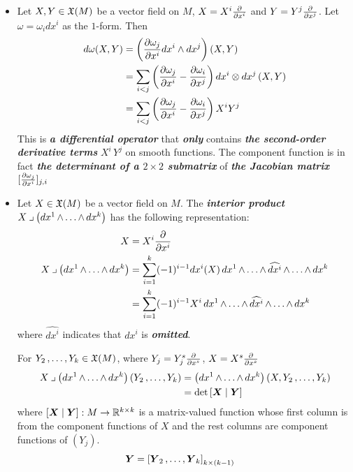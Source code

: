 \documentclass[11pt]{article}
\begin{document}
\begin{itemize}
\item Let $X, Y \in {\mathfrak X}(M)$ be a vector field on $M$, $X = X^i \frac{\partial }{ \partial x^i}$ and $Y = Y^j\frac{\partial }{ \partial x^j}$. Let $\omega = \omega_i dx^i$ as the $1$-form.  Then 
\begin{align}
d\omega(X, Y)&= \left(\frac{\partial \omega_j}{ \partial x^i}dx^i \wedge dx^j\right)\left(X, Y\right) \nonumber\\
&=\sum_{i < j}\left(\frac{\partial \omega_j}{ \partial x^i} - \frac{\partial \omega_i}{ \partial x^j}\right)dx^i \otimes dx^j\left(X, Y\right) \nonumber\\
&= \sum_{i < j}\left(\frac{\partial \omega_j}{ \partial x^i} - \frac{\partial \omega_i}{ \partial x^j}\right)X^i Y^j \label{eqn: ext_derivative_act_on_two_vector_fields}
\end{align} This is \emph{\textbf{a differential operator}} that \emph{\textbf{only}} contains \emph{\textbf{the second-order derivative terms}} $X^i\,Y^j$ on smooth functions. The component function is in fact \emph{\textbf{the determinant of a $2 \times 2$ submatrix}} of \emph{\textbf{the Jacobian matrix}} $[\frac{\partial \omega_j}{ \partial x^i}]_{j, i}$

\item Let $X \in {\mathfrak X}(M)$ be a vector field on $M$. The \emph{\textbf{interior product}} $X \mathbin{\lrcorner }{\left(dx^{1} \,{\wedge}\ldots{\wedge}\, dx^{k}\right)}$ has the following representation:
\begin{align}
X &= X^i \frac{\partial }{ \partial x^{i}}  \nonumber\\
X \mathbin{\lrcorner }{\left(dx^{1} \,{\wedge}\ldots{\wedge}\, dx^{k}\right)} &= \sum_{i=1}^{k}(-1)^{i-1}dx^i(X) \,dx^{1} \,{\wedge}\ldots{\wedge}\, \widehat{dx^i} \,{\wedge}\ldots{\wedge}\, dx^{k} \nonumber \\
&= \sum_{i=1}^{k}(-1)^{i-1}X^i\,dx^{1} \,{\wedge}\ldots{\wedge}\, \widehat{dx^i} \,{\wedge}\ldots{\wedge}\, dx^{k} \label{eqn: differential_k_form_interior_prod}
\end{align} where $\widehat{dx^i}$ indicates that $dx^i$ is \emph{\textbf{omitted}}.  

For $Y_2 \,{,}\ldots{,}\, Y_k \in {\mathfrak X}(M)$, where $Y_j = Y_j^{s}\frac{\partial }{ \partial x^s}$, $X = X^s\frac{\partial }{ \partial x^s}$
\begin{align}
X \mathbin{\lrcorner }{\left(dx^{1} \,{\wedge}\ldots{\wedge}\, dx^{k}\right)}\left(Y_2 \,{,}\ldots{,}\, Y_k\right)&=\left(dx^{1} \,{\wedge}\ldots{\wedge}\, dx^{k}\right)\left(X, Y_2 \,{,}\ldots{,}\, Y_k\right) \nonumber\\
&= \det\left[\boldsymbol{X} \mid \boldsymbol{Y}\right] \label{eqn: differential_k_form_interior_prod_mat_result}
\end{align} where $\left[\boldsymbol{X} \mid \boldsymbol{Y}\right]: M \rightarrow {\mathbb R}^{k \times k}$ is a matrix-valued function whose first column is from the component functions of $X$ and the rest columns are component functions of $(Y_j)$.
\begin{align*}
\boldsymbol{Y} &= \left[\boldsymbol{Y}_2 \,{,}\ldots{,}\, \boldsymbol{Y}_k\right]_{k \times (k-1)}
\end{align*}


\end{itemize}
\end{document}

